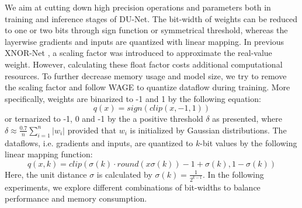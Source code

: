 We aim at cutting down high precision operations and parameters both in training and inference stages of DU-Net. The bit-width of weights can be reduced to one or two bits through sign function or symmetrical threshold, whereas the layerwise gradients and inputs are quantized with linear mapping. In previous XNOR-Net \cite{rastegari2016xnor}, a scaling factor was introduced to approximate the real-value weight. However, calculating these float factor costs additional computational resources. To further decrease memory usage and model size, we try to remove the scaling factor and follow WAGE \cite{wu2018training} to quantize dataflow during training. More specifically, weights are binarized to -1 and 1 by the following equation:
\begin{equation} \label{eq:sign}
q(x) = sign(clip(x,-1,1))
\end{equation} 
or ternarized to -1, 0 and -1 by the a positive threshold $\delta$ as \cite{li2016ternary} presented, where $\delta \approx \frac{0.7}{n}\sum_{i=1}^{n} \left | w_i \right |$ provided that $w_i$ is initialized by Gaussian distributions. The dataflows, i.e. gradients and inputs, are quantized to $k$-bit values by the following linear mapping function:
\begin{equation} \label{eq:sign}
q(x,k) = clip(\sigma(k)\cdot  round(x\sigma(k)) -1+\sigma(k),1-\sigma(k))
\end{equation} 
Here, the unit distance $\sigma$ is calculated by $\sigma(k) = \frac{1}{2^{k-1}}$. In the following experiments, we explore different combinations of bit-widths to balance performance and memory consumption.
